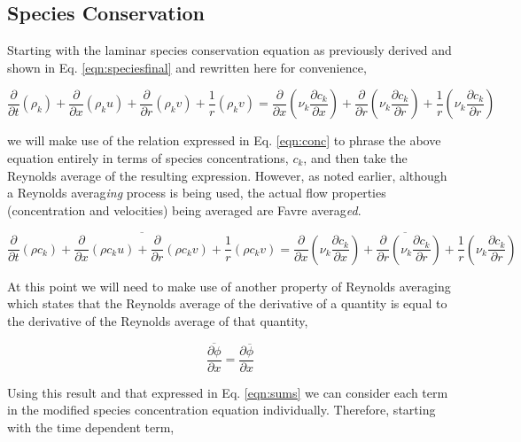\subsection{Species Conservation}

	Starting with the laminar species conservation equation as previously derived and shown in 
Eq. \ref{eqn:speciesfinal} and rewritten here for convenience,

\begin{equation}
	\frac{\partial}{\partial t}(\rho_k) + \frac{\partial}{\partial x}(\rho_k u) + \frac{\partial}{\partial r}(\rho_k v)
	+ \frac {1}{r}(\rho_k v) = \frac{\partial}{\partial x}(\nu_k \frac{\partial c_k}{\partial x}) + \frac{\partial}
	{\partial r}(\nu_k \frac{\partial c_k}{\partial r}) + \frac {1}{r}(\nu_k \frac{\partial c_k}{\partial r})
\label{eqn:speciesfinal2}
\end{equation}

	we will make use of the relation expressed in Eq. \ref{eqn:conc} to phrase the above equation entirely in 
terms of species concentrations, $c_k$, and then take the Reynolds average of the resulting expression.  However,
as noted earlier, although a Reynolds averag\emph{ing} process is being used, the actual flow properties (concentration
and velocities) being averaged are Favre averag\emph{ed}.

\begin{displaymath}
	\overline{
	\frac{\partial}{\partial t}(\rho c_k) + \frac{\partial}{\partial x}(\rho c_k u) + \frac{\partial}{\partial r}(\rho c_k v)
	+ \frac {1}{r}(\rho c_k v)} = \overline{\frac{\partial}{\partial x}(\nu_k \frac{\partial c_k}{\partial x}) + 
	\frac{\partial}{\partial r}(\nu_k \frac{\partial c_k}{\partial r}) + \frac {1}{r}(\nu_k \frac{\partial c_k}{\partial r})}
\end{displaymath}

	At this point we will need to make use of another property of Reynolds averaging which states that the
Reynolds average of the derivative of a quantity is equal to the derivative of the Reynolds average of that quantity,

\begin{equation}
	\overline{\frac{\partial \phi}{\partial x}} = \frac{\partial \overline{\phi}}{\partial x}
\label{eqn:reyderiv}
\end{equation} 

	Using this result and that expressed in Eq. \ref{eqn:sums} we can consider each term in the modified species
concentration equation individually.  Therefore, starting with the time dependent term,

